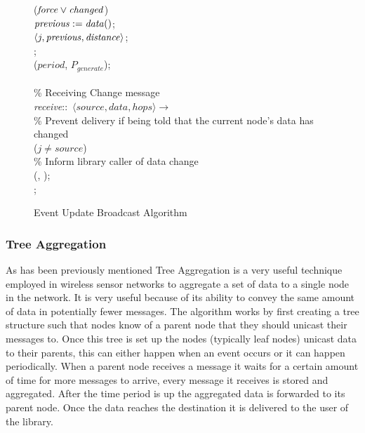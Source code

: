 \begin{figure}[H]
\begin{boxedminipage}{\linewidth}
    \null\qq\qq {} ($\mbox{\emph{force}} \lor \mbox{\emph{changed}}$) \\
    \null\qq\qq\qq $\mbox{\emph{previous}} \mathrel{:=} \mbox{\emph{data}}()$;\\
    \null\qq\qq\qq {}$\langle j, \mbox{\emph{previous}}, \mbox{\emph{distance}}\rangle$;\\
    \null\qq\qq {}; \\
    \null\qq\qq {}($\mathit{period}$, $P_{generate}$); \\~\\
    \null\qq \% Receiving Change message\\
    \null\qq \emph{receive}::~$\langle source, data, hops\rangle \rightarrow$\\
    \null\qq\qq \% Prevent delivery if being told that the current node's data has changed\\
    \null\qq\qq {} ($j \not= source$)  \\
    \null\qq\qq\qq \% Inform library caller of data change\\
    \null\qq\qq\qq {}(, ); \\
    \null\qq\qq {}; \\
  \end{boxedminipage}
  \caption{Event Update Broadcast Algorithm}
\end{figure}


\subsubsection{Tree Aggregation}

As has been previously mentioned Tree Aggregation is a very useful technique employed in wireless sensor networks to aggregate a set of data to a single node in the network. It is very useful because of its ability to convey the same amount of data in potentially fewer messages. The algorithm works by first creating a tree structure such that nodes know of a parent node that they should unicast their messages to. Once this tree is set up the nodes (typically leaf nodes) unicast data to their parents, this can either happen when an event occurs or it can happen periodically. When a parent node receives a message it waits for a certain amount of time for more messages to arrive, every message it receives is stored and aggregated. After the time period is up the aggregated data is forwarded to its parent node. Once the data reaches the destination it is delivered to the user of the library.


